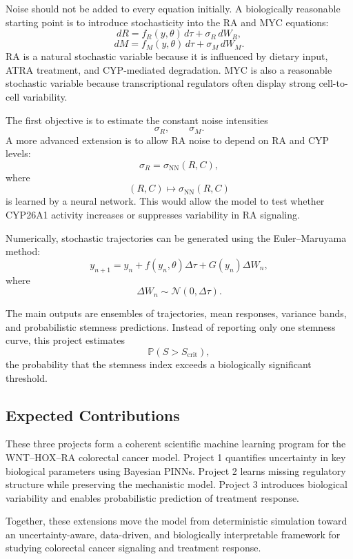 \documentclass[11pt]{article}
\begin{document}
Noise should not be added to every equation initially. A biologically reasonable
starting point is to introduce stochasticity into the RA and MYC equations:
\[
dR=f_R(y,\theta)\,d\tau+\sigma_R\,dW_R,
\]
\[
dM=f_M(y,\theta)\,d\tau+\sigma_M\,dW_M.
\]
RA is a natural stochastic variable because it is influenced by dietary input,
ATRA treatment, and CYP-mediated degradation. MYC is also a reasonable stochastic
variable because transcriptional regulators often display strong cell-to-cell
variability.

The first objective is to estimate the constant noise intensities
\[
\sigma_R,\qquad \sigma_M.
\]
A more advanced extension is to allow RA noise to depend on RA and CYP levels:
\[
\sigma_R=\sigma_{\mathrm{NN}}(R,C),
\]
where
\[
(R,C)\longmapsto \sigma_{\mathrm{NN}}(R,C)
\]
is learned by a neural network. This would allow the model to test whether
CYP26A1 activity increases or suppresses variability in RA signaling.

Numerically, stochastic trajectories can be generated using the Euler--Maruyama
method:
\[
y_{n+1}
=
y_n
+
f(y_n,\theta)\Delta \tau
+
G(y_n)\Delta W_n,
\]
where
\[
\Delta W_n\sim \mathcal N(0,\Delta \tau).
\]

The main outputs are ensembles of trajectories, mean responses, variance bands,
and probabilistic stemness predictions. Instead of reporting only one stemness
curve, this project estimates
\[
\mathbb P(S>S_{\mathrm{crit}}),
\]
the probability that the stemness index exceeds a biologically significant
threshold.

\subsection{Expected Contributions}

These three projects form a coherent scientific machine learning program for the
WNT--HOX--RA colorectal cancer model. Project 1 quantifies uncertainty in key
biological parameters using Bayesian PINNs. Project 2 learns missing regulatory
structure while preserving the mechanistic model. Project 3 introduces biological
variability and enables probabilistic prediction of treatment response.

Together, these extensions move the model from deterministic simulation toward an
uncertainty-aware, data-driven, and biologically interpretable framework for
studying colorectal cancer signaling and treatment response.
\end{document}

